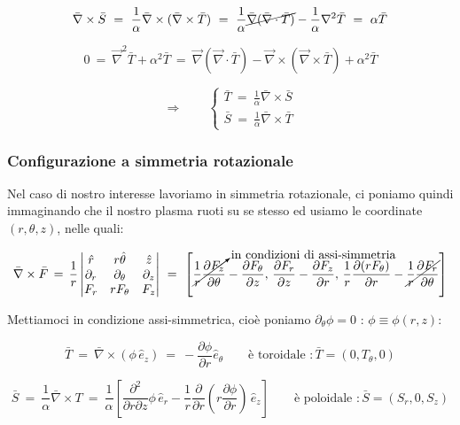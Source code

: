 \[\bar \nabla \times \bar S\ =\ \frac{1}{\alpha}\bar \nabla \times (\bar \nabla \times \bar T)\ =\ \frac{1}{\alpha}\cancel{\bar \nabla (\bar \nabla\cdot  \bar T)}-\frac{1}{\alpha}\nabla^2 \bar T\ =\ \alpha \bar T\]

\[ 0\ =\ \vec \nabla^2 \bar T + \alpha^2 \bar T\ =\ \vec \nabla (\vec \nabla \cdot \bar T) - \vec \nabla \times (\vec \nabla \times \bar T) + \alpha^2 \bar T \]

\[\Rightarrow \quad \quad 
\begin{cases}
	\bar T\ =\ \frac{1}{\alpha} \bar \nabla \times \bar S\\
	\bar S\ =\ \frac{1}{\alpha} \bar \nabla \times \bar T
\end{cases}\]


%
%
%
\subsubsection{Configurazione a simmetria rotazionale}

Nel caso di nostro interesse lavoriamo in simmetria rotazionale, ci poniamo quindi immaginando che il nostro plasma ruoti su se stesso ed usiamo le coordinate $(r,\theta, z)$, nelle quali:

\[\bar \nabla \times \bar F\, =\, \frac{1}{r}
\begin{vmatrix} 
	\hat r & r\hat \theta & \hat z \\ 
	\partial_r & \partial_\theta & \partial_z\\
	F_r & r F_\theta & F_z
\end{vmatrix}\ =\ 
\left[\cancelto{\text{in condizioni di assi-simmetria}}{\frac{1}{r}\frac{\partial F_z}{\partial \theta}}-\frac{\partial F_\theta}{\partial z},\, \frac{\partial F_r}{\partial z}-\frac{\partial F_z}{\partial r},\,\frac{1}{r}\frac{\partial (r F_\theta)}{\partial r}-\cancel{\frac{1}{r}\frac{\partial F_r}{\partial \theta}}\right] \]

Mettiamoci in condizione assi-simmetrica, cioè poniamo $\partial_\theta\phi = 0$ : $\phi\equiv\phi(r,z)$:

\[\bar T\ =\ \bar \nabla \times (\phi\, \hat e_z)\ =\ -\frac{\partial \phi}{\partial r}\hat e_\theta\qquad \text{è toroidale  }: \bar T = (0,T_\theta, 0) \]

\[\bar S\ =\ \frac{1}{\alpha}\bar \nabla \times T \ =\ \frac{1}{\alpha} \left[ \frac{\partial^2}{\partial r\partial z} \phi \,\hat e_r - \frac{1}{r}\frac{\partial}{\partial r}(r\frac{\partial \phi}{\partial r})\,\hat e_z\right]\qquad \text{è poloidale  }: \bar S = (S_r,0, S_z)\]

